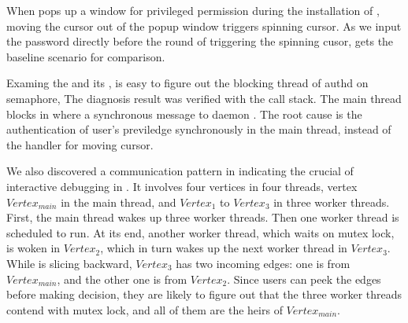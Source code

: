 When  pops up a window for privileged permission during the
installation of , moving the cursor out of the popup
window triggers spinning cursor. As we input the password directly before the
round of triggering the spinning cusor, \xxx gets the baseline scenario for
comparison.

Examing the \spinningnode and its \similarnode, \xxx is easy to figure
out the blocking thread of authd on semaphore, The diagnosis result was
verified with the call stack. The main thread blocks in  where a synchronous message to daemon .
The root cause is the authentication of user's previledge synchronously in the
main thread, instead of the handler for moving cursor.

We also discovered a communication pattern in  indicating the
crucial of interactive debugging in \xxx. It involves four vertices in four
threads, vertex $Vertex_{main}$ in the main thread, and $Vertex_1$ to $Vertex_3$
in three worker threads. First, the main thread wakes up three worker threads.
Then one worker thread is scheduled to run. At its end, another worker thread,
which waits on mutex lock, is woken in $Vertex_2$, which in turn wakes up the
next worker thread in $Vertex_3$. While \xxx is slicing backward, $Vertex_3$
has two incoming edges: one is from $Vertex_{main}$, and the other one is from
$Vertex_2$. Since users can peek the edges before making decision, they are
likely to figure out that the three worker threads contend with mutex lock, and
all of them are the heirs of $Vertex_{main}$.
